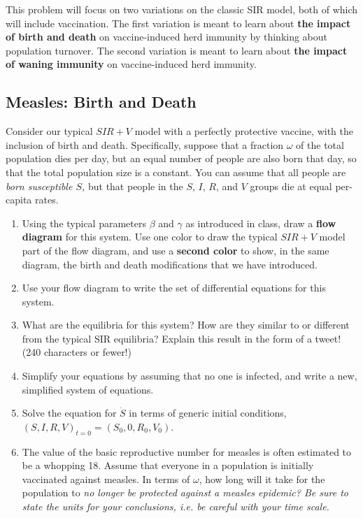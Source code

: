 \documentclass[11pt,onecolumn,superscriptaddress,notitlepage]{article}
\begin{document}
This problem will focus on two variations on the classic SIR model, both of which will include vaccination. The first variation is meant to learn about {\bf the impact of birth and death} on vaccine-induced herd immunity by thinking about population turnover. The second variation is meant to learn about {\bf the impact of waning immunity} on vaccine-induced herd immunity.

\subsection*{Measles: Birth and Death}

Consider our typical $SIR+V$ model with a perfectly protective vaccine, with the inclusion of birth and death. Specifically, suppose that a fraction $\omega$ of the total population dies per day, but an equal number of people are also born that day, so that the total population size is a constant. You can assume that all people are {\it born susceptible $S$,} but that people in the $S$, $I$, $R$, and $V$ groups die at equal per-capita rates.

\begin{enumerate}[resume]
	\item Using the typical parameters $\beta$ and $\gamma$ as introduced in class, draw a {\bf flow diagram} for this system. Use one color to draw the typical $SIR+V$ model part of the flow diagram, and use a {\bf second color} to show, in the same diagram, the birth and death modifications that we have introduced.
	\item Use your flow diagram to write the set of differential equations for this system.
	\item What are the equilibria for this system? How are they similar to or different from the typical SIR equilibria? Explain this result in the form of a tweet! (240 characters or fewer!)
	\item Simplify your equations by assuming that no one is infected, and write a new, simplified system of equations. 
	\item Solve the equation for $\dot{S}$ in terms of generic initial conditions, $ (S,I,R,V)_{t=0} = (S_0, 0, R_0, V_0)$. 
	\item The value of the basic reproductive number for measles is often estimated to be a whopping 18. Assume that everyone in a population is initially vaccinated against measles. In terms of $\omega$, how long will it take for the population to {\it no longer be protected against a measles epidemic? Be sure to state the units for your conclusions, i.e. be careful with your time scale.}
\end{enumerate}
\end{document}
